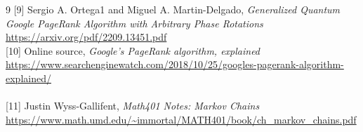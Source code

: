 \documentclass[12pt]{article}
\begin{document}
\begin{thebibliography}{9}
[9] Sergio A. Ortega1 and Miguel A. Martin-Delgado, \emph{Generalized Quantum Google PageRank Algorithm with Arbitrary Phase Rotations}\\
\url{https://arxiv.org/pdf/2209.13451.pdf}\\

[10] Online source, \emph{Google's PageRank algorithm, explained}\\
\url{https://www.searchenginewatch.com/2018/10/25/googles-pagerank-algorithm-explained/}\\\\

[11] Justin Wyss-Gallifent, \emph{Math401 Notes: Markov Chains}\\
\url{https://www.math.umd.edu/~immortal/MATH401/book/ch_markov_chains.pdf}

\end{thebibliography}
\end{document}
